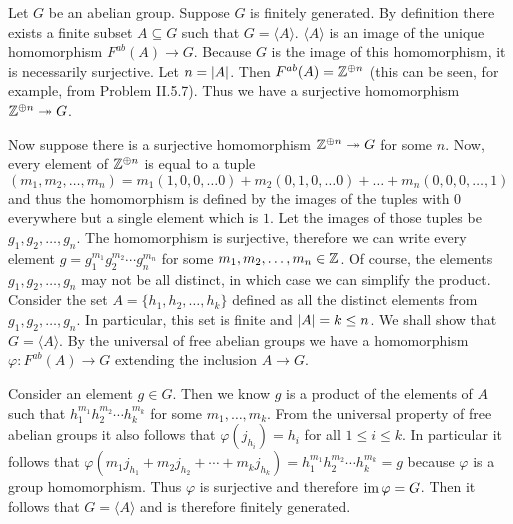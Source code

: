 \begin{solution}
	Let $G$ be an abelian group. Suppose $G$ is finitely generated. By definition there exists a finite subset $A \subseteq G$ such that $G = \langle A \rangle$. $\langle A \rangle$ is an image of the unique homomorphism $F^{ab}(A) \to G$. Because $G$ is the image of this homomorphism, it is necessarily surjective. Let $n = \left|A\right|$. Then $F^{ab}(A) = \mathbb{Z}^{\oplus n}$ (this can be seen, for example, from Problem II.5.7). Thus we have a surjective homomorphism $\mathbb{Z}^{\oplus n} \twoheadrightarrow G$.
	
	Now suppose there is a surjective homomorphism $\mathbb{Z}^{\oplus n} \twoheadrightarrow G$ for some $n$. Now, every element of $\mathbb{Z}^{\oplus n}$ is equal to a tuple $(m_1, m_2, \dots, m_n) = m_1 (1, 0, 0, \dots 0) + m_2 (0, 1, 0, \dots 0) + \dots + m_n(0, 0, 0, \dots, 1)$ and thus the homomorphism is defined by the images of the tuples with $0$ everywhere but a single element which is $1$. Let the images of those tuples be $g_1, g_2, \dots, g_n$. The homomorphism is surjective, therefore we can write every element $g = g_1^{m_1} g_2^{m_2} \cdots g_n^{m_n}$ for some $m_1, m_2, \dots, m_n \in \mathbb{Z}$. Of course, the elements $g_1, g_2, \dots, g_n$ may not be all distinct, in which case we can simplify the product. Consider the set $A = \{ h_1, h_2, \dots, h_k \}$ defined as all the distinct elements from $g_1, g_2, \dots, g_n$. In particular, this set is finite and $\left|A\right| = k \leq n$. We shall show that $G = \langle A \rangle$. By the universal of free abelian groups we have a homomorphism $\varphi: F^{ab}(A) \to G$ extending the inclusion $A \to G$.
	
	Consider an element $g \in G$. Then we know $g$ is a product of the elements of $A$ such that $h_1^{m_1} h_2^{m_2} \cdots h_k^{m_k}$ for some $m_1, \dots, m_k$. From the universal property of free abelian groups it also follows that $\varphi(j_{h_i}) = h_i$ for all $1 \leq i \leq k$.  In particular it follows that $\varphi(m_1 j_{h_1} + m_2 j_{h_2} + \cdots + m_k j_{h_k}) = h_1^{m_1} h_2^{m_2} \cdots h_k^{m_k} = g$ because $\varphi$ is a group homomorphism. Thus $\varphi$ is surjective and therefore $\operatorname{im} \varphi = G$. Then it follows that $G = \langle A \rangle$ and is therefore finitely generated.
\end{solution}

\begin{problem}
\end{problem}

